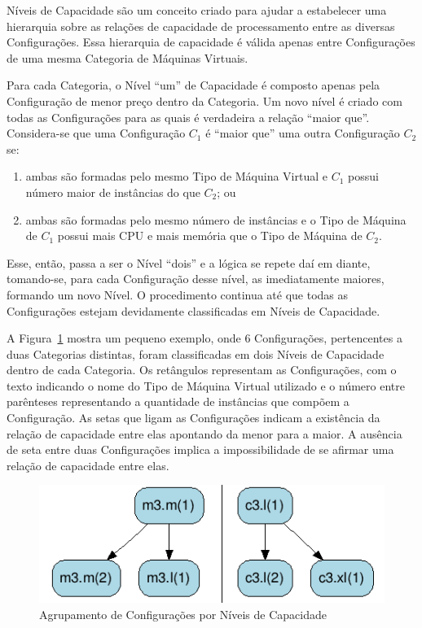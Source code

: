 \documentclass[12pt]{article}
\begin{document}
Níveis de Capacidade são um conceito criado para ajudar a estabelecer uma hierarquia 
sobre as relações de capacidade de processamento entre as diversas Configurações. 
Essa hierarquia de capacidade é válida apenas entre Configurações de uma mesma 
Categoria de Máquinas Virtuais. 

Para cada Categoria, o Nível ``um'' de Capacidade é composto apenas pela Configuração 
de menor preço dentro da Categoria. Um novo nível é criado com todas as Configurações 
para as quais é verdadeira a relação ``maior que''. Considera-se que uma 
Configuração $C_1$ é ``maior que'' uma outra Configuração $C_2$ se: 

\begin{enumerate}%
\item ambas são formadas pelo mesmo Tipo de Máquina Virtual e $C_1$ possui 
número maior de instâncias do que $C_2$; ou
\item ambas são formadas pelo mesmo número de instâncias
e o Tipo de Máquina de $C_1$ possui mais CPU e mais memória que o Tipo de Máquina
de $C_2$.  
\end{enumerate}

Esse, então, passa a ser o Nível 
``dois'' e a lógica se repete daí em diante, tomando-se, para cada Configuração 
desse nível, as imediatamente maiores, formando um novo Nível. O procedimento 
continua até que todas as Configurações estejam devidamente classificadas em 
Níveis de Capacidade.

A Figura~\ref{fig_niveis_capacidade} mostra um pequeno exemplo, onde 6 Configurações,
pertencentes a duas Categorias distintas, foram classificadas em dois Níveis de 
Capacidade dentro de cada Categoria. Os retângulos representam as Configurações, 
com o texto indicando o nome do Tipo de Máquina Virtual utilizado e o número entre 
parênteses representando a quantidade de instâncias que compõem a Configuração. 
As setas que ligam as Configurações indicam a existência da relação de capacidade 
entre elas apontando da menor para a maior. A ausência de seta entre duas Configurações 
implica a impossibilidade de se afirmar uma relação de capacidade entre elas. 

\begin{figure}[t]
  \begin{center}
    \includegraphics[scale=.65]{img/exemplo-niveis-capacidade}
  \end{center}
  \caption{\label{fig_niveis_capacidade}Agrupamento de Configurações por Níveis de Capacidade}
\end{figure}
\end{document}
